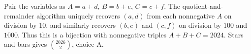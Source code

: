 Pair the variables as $A=a+d$, $B=b+e$, $C=c+f$. The quotient-and-remainder algorithm uniquely recovers $(a,d)$ from each nonnegative $A$ on division by $10$, and similarly recovers $(b,e)$ and $(c,f)$ on division by $100$ and $1000$. Thus this is a bijection with nonnegative triples $A+B+C=2024$. Stars and bars gives $\boxed{\binom{2026}{2}}$, choice A.
